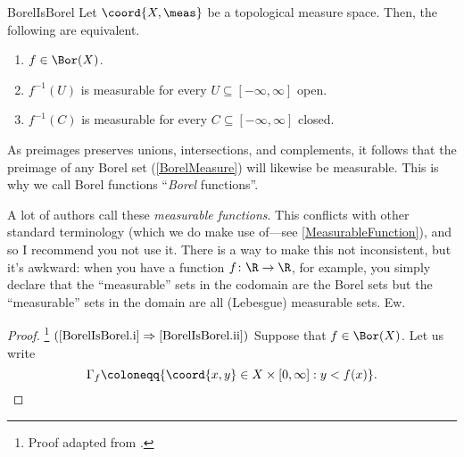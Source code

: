 \begin{prp}{}{BorelIsBorel}
Let $\coord{X,\meas}$ be a topological measure space.  Then, the following are equivalent.
\begin{enumerate}
\item \label{BorelIsBorel.i}$f\in \Bor (X)$.
\item \label{BorelIsBorel.ii}$f^{-1}(U)$ is measurable for every $U\subseteq [-\infty ,\infty ]$ open.
\item \label{BorelIsBorel.iii}$f^{-1}(C)$ is measurable for every $C\subseteq [-\infty ,\infty ]$ closed.
\end{enumerate}
\begin{rmk}
As preimages preserves unions, intersections, and complements, it follows that the preimage of any Borel set (\cref{BorelMeasure}) will likewise be measurable.  This is why we call Borel functions ``\emph{Borel} functions''.
\end{rmk}
\begin{rmk}
A lot of authors call these \emph{measurable functions}.  This conflicts with other standard terminology (which we do make use of---see \cref{MeasurableFunction}), and so I recommend you not use it.  There is a way to make this not inconsistent, but it's awkward:  when you have a function $f\colon \R \rightarrow \R$, for example, you simply declare that the ``measurable'' sets in the codomain are the Borel sets but the ``measurable'' sets in the domain are all (Lebesgue) measurable sets.  Ew.
\end{rmk}
\begin{proof}\footnote{Proof adapted from \cite[pg.~384]{Pugh}.}
$(\cref{BorelIsBorel.i}\Rightarrow \cref{BorelIsBorel.ii})$ Suppose that $f\in \Bor (X)$.  Let us write
\begin{equation}
\Gamma _f\coloneqq \{ \coord{x,y}\in X\times [0,\infty ]:y<f(x)\} .
\end{equation}


\end{proof}
\end{prp}
